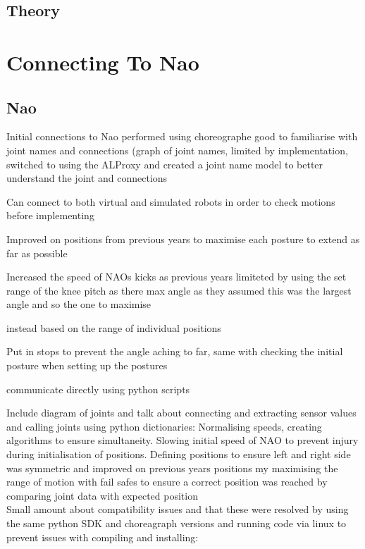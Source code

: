 \documentclass[11pt]{article}
\begin{document}
\subsection{Theory}

\section{Connecting To Nao}

\subsection{Nao}
Initial connections to Nao performed using choreographe good to familiarise with joint names and connections (graph of joint names, limited by implementation, switched to using the ALProxy and created a joint name model to better understand the joint and connections

Can connect to both virtual and simulated robots in order to check motions before implementing 

Improved on positions from previous years to maximise each posture to extend as far as possible 

Increased the speed of NAOs kicks as previous years limiteted by using the set range of the knee pitch as there max angle as they  assumed this was the largest angle and so the one to maximise

instead based on the range of individual positions 

Put in stops to prevent the angle aching to far, same with checking the initial posture when setting up the postures

communicate directly using python scripts


Include diagram of joints and talk about connecting and extracting sensor values and calling joints using python dictionaries:
Normalising speeds, creating algorithms to ensure simultaneity.
Slowing initial speed of NAO to prevent injury during initialisation of positions.
Defining positions to ensure left and right side was symmetric and improved on previous years positions my maximising the range of motion with fail safes to ensure a correct position was reached by comparing joint data with expected position\\

Small amount about compatibility issues and that these were resolved by using the same python SDK and choreagraph versions and running code via linux to prevent issues with compiling and installing: 
\end{document}
